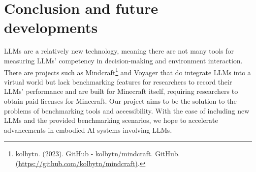 \documentclass{article}
\begin{document}
\section{Conclusion and future developments}
LLMs are a relatively new technology, meaning there are not many tools for measuring LLMs' competency in decision-making and environment interaction.
There are projects such as Mindcraft\footnote{kolbytn. (2023). GitHub - kolbytn/mindcraft. GitHub. \url{(https://github.com/kolbytn/mindcraft)}.} and Voyager that do integrate LLMs into a virtual world but lack benchmarking features for researchers to record their LLMs' performance and are built for Minecraft itself, requiring researchers to obtain paid licenses for Minecraft.
Our project aims to be the solution to the problems of benchmarking tools and accessibility.
With the ease of including new LLMs and the provided benchmarking scenarios, we hope to accelerate advancements in embodied AI systems involving LLMs.
\end{document}
